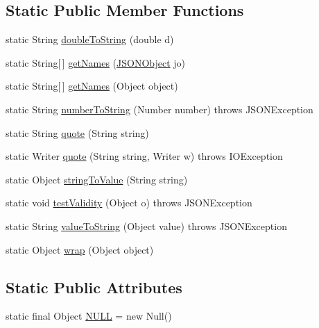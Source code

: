 \subsection*{Static Public Member Functions}
\begin{DoxyCompactItemize}
\item 
static String \hyperlink{classorg_1_1json_1_1JSONObject_aad3ea50c3546331486737bcb24e42460}{double\-To\-String} (double d)
\item 
static String\mbox{[}$\,$\mbox{]} \hyperlink{classorg_1_1json_1_1JSONObject_a30d4e44e4c8e03341c346970a00ba283}{get\-Names} (\hyperlink{classorg_1_1json_1_1JSONObject}{J\-S\-O\-N\-Object} jo)
\item 
static String\mbox{[}$\,$\mbox{]} \hyperlink{classorg_1_1json_1_1JSONObject_acf2ec104b4cbbf2947b155d54047efe8}{get\-Names} (Object object)
\item 
static String \hyperlink{classorg_1_1json_1_1JSONObject_a5ea1eb29e2e3bdc7b4fae0579ead8525}{number\-To\-String} (Number number)  throws J\-S\-O\-N\-Exception 
\item 
static String \hyperlink{classorg_1_1json_1_1JSONObject_abe60222a3919d3f88f104486c1ef13fe}{quote} (String string)
\item 
static Writer \hyperlink{classorg_1_1json_1_1JSONObject_aac3d22e558d472049d4c8702cdaf676a}{quote} (String string, Writer w)  throws I\-O\-Exception 
\item 
static Object \hyperlink{classorg_1_1json_1_1JSONObject_a23f861897abe58eb41c044dd63667319}{string\-To\-Value} (String string)
\item 
static void \hyperlink{classorg_1_1json_1_1JSONObject_a406920be130176bad74d605bae04a6da}{test\-Validity} (Object o)  throws J\-S\-O\-N\-Exception 
\item 
static String \hyperlink{classorg_1_1json_1_1JSONObject_ab386b6f594205eecdbe023ad7cb26105}{value\-To\-String} (Object value)  throws J\-S\-O\-N\-Exception 
\item 
static Object \hyperlink{classorg_1_1json_1_1JSONObject_a5aa793d5ebe4bb6002bd37d84d65742e}{wrap} (Object object)
\end{DoxyCompactItemize}
\subsection*{Static Public Attributes}
\begin{DoxyCompactItemize}
\item 
static final Object \hyperlink{classorg_1_1json_1_1JSONObject_a01c74a31a1abfd34ab13beb9347855ac}{N\-U\-L\-L} = new Null()
\end{DoxyCompactItemize}
